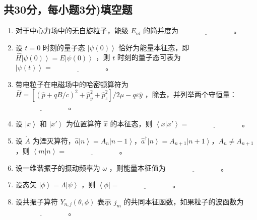 \subsection{共30分，每小题3分)填空题}
\begin{enumerate}
    \item 对于中心力场中的无自旋粒子，能级 $E_{nl}$ 的简并度为 $\underline{\hspace{3cm}}$ 。
    \item 设 $t=0$ 时刻的量子态 $\left|\psi(0)\right\rangle$ 恰好为能量本征态，即 $\hat{H}\left|\psi(0)\right\rangle = E\left|\psi(0)\right\rangle$ ，则 $t$ 时刻的量子态可表为 $\left|\psi(t)\right\rangle = \underline{\hspace{3cm}}$ 。
    \item 带电粒子在电磁场中的哈密顿算符为 $\hat{H} = \left[(\hat{p} + qB/c)^2 + \hat{p}_y^2 + \hat{p}_z^2\right]/ 2\mu - q \varepsilon \hat{y}$ ，除去，并列举两个守恒量： $\underline{\hspace{3cm}}$ 。
    \item 设 $\left| x \right\rangle$ 和 $\left| x' \right\rangle$ 为位置算符 $\hat{x}$ 的本征态，则 $\left\langle x \left| x' \right\rangle\right. = \underline{\hspace{3cm}}$ 。
    \item 设 $\dot{A}$ 为湮灭算符，$\hat{a}\left| n \right\rangle = A_n\left| n-1 \right\rangle$，$\hat{a}^\dagger \left| n \right\rangle = A_{n+1}\left| n+1 \right\rangle$，$A_n \ne A_{n+1}$ ，则 $\left\langle m \left| n \right\rangle\right. = \underline{\hspace{3cm}}$ 。
    \item 设一维谐振子的摄动频率为 $\omega$ ，则能量本征值为 $\underline{\hspace{3cm}}$ 。
    \item 设态矢 $\left|\phi\right\rangle =  \Lambda\left|\psi\right\rangle$ ，则 $\left\langle \phi|\right. = \underline{\hspace{3cm}}$ 。
    \item 设共振子算符 $Y_{n,j}(\theta,\phi)$ 表示 $j_{m}$ 的共同本征函数，如果粒子的波函数为 $\underline{\hspace{3cm}}$ 。
\end{enumerate}
